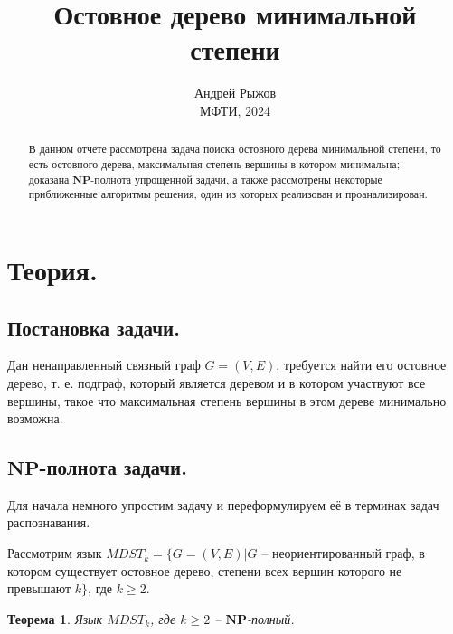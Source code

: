 \documentclass[a4paper,11pt]{article}
\author{Андрей Рыжов\\МФТИ, 2024}
\title{Остовное дерево минимальной степени}
\renewcommand{\ge}{\ensuremath{\geqslant}}
\theoremstyle{plain}
\newtheorem{theorem}{Теорема}[section]
\theoremstyle{definition}
\theoremstyle{remark}
\begin{document}
\maketitle

\begin{abstract}
В данном отчете рассмотрена задача поиска остовного дерева минимальной степени, то есть остовного дерева, максимальная степень вершины в котором минимальна; доказана $\mathbf{NP}$-полнота упрощенной задачи, а также рассмотрены некоторые приближенные алгоритмы решения, один из которых реализован и проанализирован.

\end{abstract}

\section{Теория.}
\subsection{Постановка задачи.}

Дан ненаправленный связный граф $G = (V, E)$, требуется найти его остовное дерево, т. е. подграф, который является деревом и в котором участвуют все вершины, такое что максимальная степень вершины в этом дереве минимально возможна.

\subsection{$\mathbf{NP}$-полнота задачи.}

Для начала немного упростим задачу и переформулируем её в терминах задач распознавания.

Рассмотрим язык $MDST_k = \{G = (V, E) | G$ -- неориентированный граф, в котором существует остовное дерево, степени всех вершин которого не превышают $k\}$, где $k \ge 2$.

\begin{theorem}
Язык $MDST_k$, где $k \ge 2$ -- $\mathbf{NP}$-полный.
\end{theorem}
\end{document}
